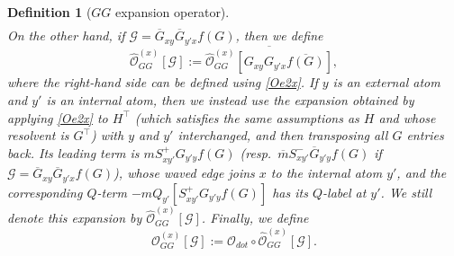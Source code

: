 \documentclass{article}
\newcommand{\1}{\mathds{1}}
\numberwithin{equation}{section}
\renewcommand{\cal}{\mathcal}
\newcommand{\wh}{\widehat}
\theoremstyle{plain} %
\newtheorem{definition}[theorem]{Definition}
\theoremstyle{remark}
\begin{document}
\begin{definition}[$G G$ expansion operator]
\begin{align}
 \end{align}
On the other hand, if $\cal G=\overline G_{xy}  \overline G_{y' x }  f(G)$, then we define 
$$\wh{\cal O}_{GG}^{(x)}\left[\cal G\right]:=\overline{ \wh{\cal O}_{GG}^{(x)}\left[G_{xy}   G_{y' x }  \overline{f(G)}\right] },$$
where the right-hand side can be defined using \eqref{Oe2x}. If $y$ is an external atom and $y'$ is an internal atom, then we instead use the expansion obtained by applying \eqref{Oe2x} to $H^\top$ (which satisfies the same assumptions as $H$ and whose resolvent is $G^\top$) with $y$ and $y'$ interchanged, and then transposing all $G$ entries back. Its leading term is $m S^{+}_{xy'} G_{y' y} f(G)$ (resp.~$\overline m S^{-}_{xy'} \overline G_{y' y} f(G)$ if $\cal G=\overline G_{xy}  \overline G_{y' x }  f(G)$), whose waved edge joins $x$ to the internal atom $y'$, and the corresponding $Q$-term $-m Q_{y'}[S^{+}_{xy'} G_{y' y} f(G)]$ has its $Q$-label at $y'$. We still denote this expansion by $\wh{\cal O}_{GG}^{(x)}[\cal G]$. Finally, we define
$${\cal O}_{GG}^{(x)}[ \cal G]:= \cal O_{dot} \circ  \wh{\cal O}_{GG}^{(x)}   [\cal G]. $$  
\end{definition}
\end{document}

